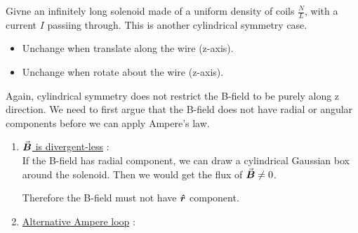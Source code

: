\documentclass[class=article, crop=false, 12pt]{standalone}
\begin{document}
\begin{example}
    Givne an infinitely long solenoid made of a uniform density of coils $\frac{N}{L}$,
    with a current $I$ passiing through.
    This is another cylindrical symmetry case.
    \begin{itemize}
        \item Unchange when translate along the wire (z-axis).
        \item Unchange when rotate about the wire (z-axis).
    \end{itemize}
    
    Again, cylindrical symmetry does not restrict the B-field to be purely along z direction. 
    We need to first argue that the B-field does not have radial or angular components 
    before we can apply Ampere's law.

    \begin{enumerate}
        \item \ul{$\va*{B}$ is divergent-less} : \\
        If the B-field has radial component,
        we can draw a cylindrical Gaussian box around the solenoid.
        Then we would get the flux of $\va*{B}\neq 0$.


        Therefore the B-field must not have $\vu*{r}$ component.

        \item \ul{Alternative Ampere loop} : \\


    \end{enumerate}
    

\end{example}
\end{document}

